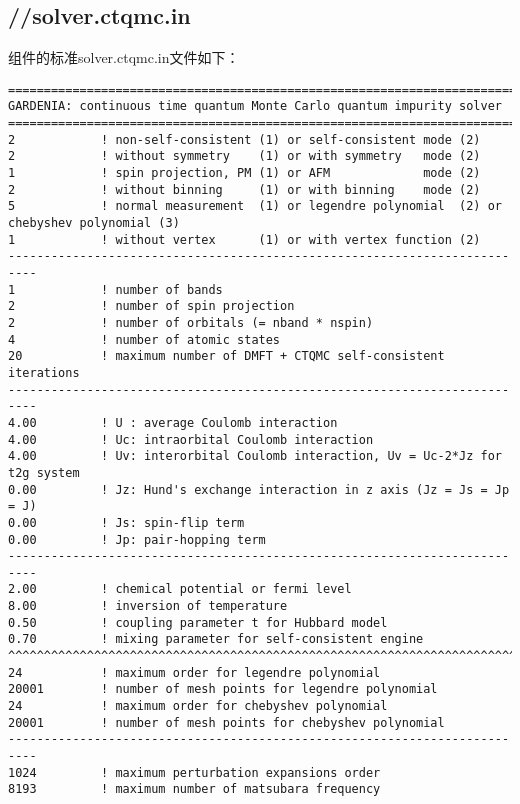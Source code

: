 \subsection{{\gardenia}//solver.ctqmc.in}

{\gardenia}组件的标准solver.ctqmc.in文件如下：

\begin{lstlisting}[frame=single]
==========================================================================
GARDENIA: continuous time quantum Monte Carlo quantum impurity solver
==========================================================================
2            ! non-self-consistent (1) or self-consistent mode (2)
2            ! without symmetry    (1) or with symmetry   mode (2)
1            ! spin projection, PM (1) or AFM             mode (2)
2            ! without binning     (1) or with binning    mode (2)
5            ! normal measurement  (1) or legendre polynomial  (2) or chebyshev polynomial (3)
1            ! without vertex      (1) or with vertex function (2)
--------------------------------------------------------------------------
1            ! number of bands
2            ! number of spin projection
2            ! number of orbitals (= nband * nspin)
4            ! number of atomic states
20           ! maximum number of DMFT + CTQMC self-consistent iterations
--------------------------------------------------------------------------
4.00         ! U : average Coulomb interaction
4.00         ! Uc: intraorbital Coulomb interaction
4.00         ! Uv: interorbital Coulomb interaction, Uv = Uc-2*Jz for t2g system
0.00         ! Jz: Hund's exchange interaction in z axis (Jz = Js = Jp = J)
0.00         ! Js: spin-flip term
0.00         ! Jp: pair-hopping term
--------------------------------------------------------------------------
2.00         ! chemical potential or fermi level
8.00         ! inversion of temperature
0.50         ! coupling parameter t for Hubbard model
0.70         ! mixing parameter for self-consistent engine
^^^^^^^^^^^^^^^^^^^^^^^^^^^^^^^^^^^^^^^^^^^^^^^^^^^^^^^^^^^^^^^^^^^^^^^^^^
24           ! maximum order for legendre polynomial
20001        ! number of mesh points for legendre polynomial
24           ! maximum order for chebyshev polynomial
20001        ! number of mesh points for chebyshev polynomial
--------------------------------------------------------------------------
1024         ! maximum perturbation expansions order
8193         ! maximum number of matsubara frequency

\end{lstlisting}
